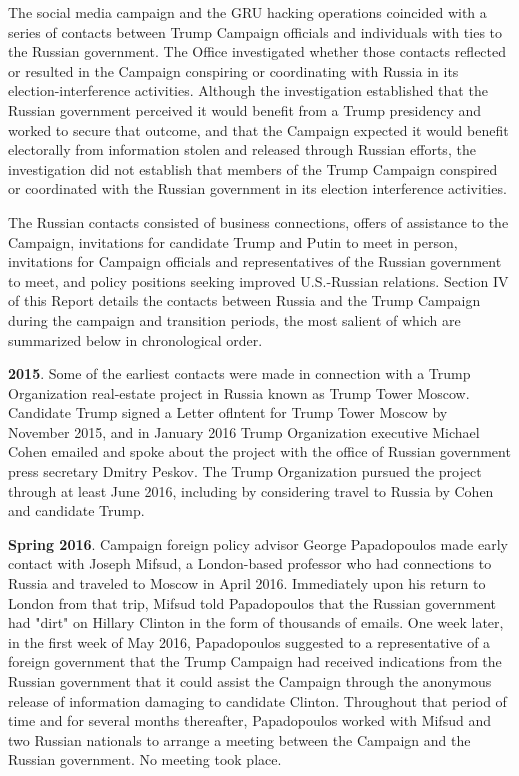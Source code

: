 \documentclass{article}
\begin{document}
The social media campaign and the GRU hacking operations coincided with a  series of contacts between Trump Campaign officials and individuals with ties to the Russian government. The Office investigated whether those contacts reflected or resulted in the Campaign conspiring or coordinating with Russia in its election-interference activities. Although the investigation established that the Russian government perceived it would benefit from a Trump presidency and worked to secure that outcome, and that the Campaign expected it would benefit electorally from information stolen and released through Russian efforts, the investigation did not establish that members of the Trump Campaign conspired or coordinated with the Russian government in its election interference activities.

The Russian contacts consisted of business connections, offers of assistance to the Campaign, invitations for candidate Trump and Putin to meet in person, invitations for Campaign officials and representatives of the Russian government to meet,  and policy positions seeking improved U.S.-Russian relations. Section IV of this Report details the contacts between Russia and the Trump Campaign during the campaign and transition periods, the most salient of which are summarized below in chronological order.

\textbf{2015}. Some of the earliest contacts were made in connection with a Trump Organization real-estate project in Russia known as Trump Tower Moscow. Candidate Trump signed a Letter oflntent for Trump Tower Moscow by November 2015, and in January 2016 Trump Organization executive Michael Cohen emailed and spoke about the project with the office of Russian government press secretary Dmitry Peskov. The Trump Organization pursued the project through at least June 2016, including by considering travel to Russia by Cohen and candidate Trump.

\textbf{Spring 2016}. Campaign foreign policy advisor George Papadopoulos made early contact with Joseph Mifsud, a  London-based professor who had connections to Russia and traveled to Moscow in April 2016. Immediately upon his return to London from that trip,  Mifsud told Papadopoulos that the Russian government had "dirt" on Hillary Clinton in the form of thousands of emails. One week later, in the first week of May 2016,  Papadopoulos suggested to a representative of a  foreign government that the Trump Campaign had received indications from the Russian government that it could assist the Campaign through the anonymous release of information damaging to candidate Clinton. Throughout that period of time and for several months thereafter, Papadopoulos worked with Mifsud and two Russian nationals to arrange a  meeting between the Campaign and the Russian government. No meeting took place.
\end{document}
